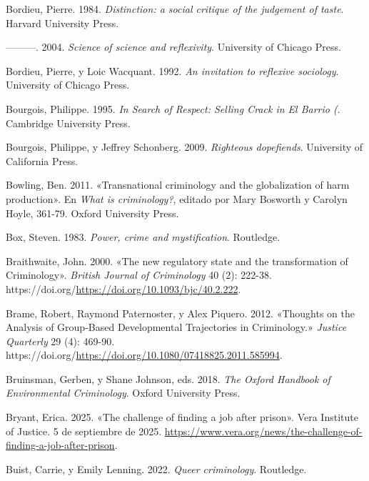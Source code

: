 \documentclass[
  spanish,
  letterpaper,
  DIV=11,
  numbers=noendperiod]{scrreprt}
\newlength{\cslhangindent}
\newenvironment{CSLReferences}[2] %
 {\begin{list}{}{%
  \setlength{\itemindent}{0pt}
  \setlength{\leftmargin}{0pt}
  \setlength{\parsep}{0pt}
  \ifodd #1
   \setlength{\leftmargin}{\cslhangindent}
   \setlength{\itemindent}{-1\cslhangindent}
  \fi
  \setlength{\itemsep}{#2\baselineskip}}}
 {\end{list}}
\begin{document}
\begin{CSLReferences}{1}{0}
Bordieu, Pierre. 1984. \emph{Distinction: a social critique of the
judgement of taste}. Harvard University Press.

---------. 2004. \emph{Science of science and reflexivity}. University
of Chicago Press.

Bordieu, Pierre, y Loic Wacquant. 1992. \emph{An invitation to reflexive
sociology}. University of Chicago Press.

Bourgois, Philippe. 1995. \emph{In Search of Respect: Selling Crack in
El Barrio (}. Cambridge University Press.

Bourgois, Philippe, y Jeffrey Schonberg. 2009. \emph{Righteous
dopefiends}. University of California Press.

Bowling, Ben. 2011. {«Transnational criminology and the globalization of
harm production»}. En \emph{What is criminology?}, editado por Mary
Bosworth y Carolyn Hoyle, 361-79. Oxford University Press.

Box, Steven. 1983. \emph{Power, crime and mystification}. Routledge.

Braithwaite, John. 2000. {«The new regulatory state and the
transformation of Criminology»}. \emph{British Journal of Criminology}
40 (2): 222-38.
https://doi.org/\url{https://doi.org/10.1093/bjc/40.2.222}.

Brame, Robert, Raymond Paternoster, y Alex Piquero. 2012. {«Thoughts on
the Analysis of Group-Based Developmental Trajectories in Criminology.»}
\emph{Justice Quarterly} 29 (4): 469-90.
https://doi.org/\url{https://doi.org/10.1080/07418825.2011.585994}.

Bruinsman, Gerben, y Shane Johnson, eds. 2018. \emph{The Oxford Handbook
of Environmental Criminology}. Oxford University Press.

Bryant, Erica. 2025. {«The challenge of finding a job after prison»}.
Vera Institute of Justice. 5 de septiembre de 2025.
\url{https://www.vera.org/news/the-challenge-of-finding-a-job-after-prison}.

Buist, Carrie, y Emily Lenning. 2022. \emph{Queer criminology}.
Routledge.


\end{CSLReferences}
\end{document}

